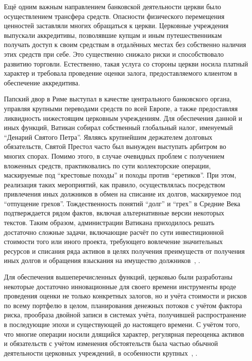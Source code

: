 \documentclass[12pt]{scrartcl}
\begin{document}
Ещё одним важным направлением банковской деятельности церкви было осуществлением трансфера средств. Опасности физического перемещения ценностей заставляли многих обращаться к церкви. Церковные учреждения выпускали аккредитивы, позволявшие купцам и иным путешественникам получать доступ к своим средствам в отдалённых местах без собственно наличия этих средств при себе. Это существенно снижало риски и способствовало развитию торговли. Естественно, такая услуга со стороны церкви носила платный характер и требовала проведение оценки залога, предоставляемого клиентом в обеспечение аккредитива.

Папский двор в Риме выступал в качестве центрального банковского органа, управляя крупными переводами средств по всей Европе, а также предоставляя ликвидность нижестоящим церковным учреждениям. Для обеспечения данной и иных функций, Ватикан собирал собственный глобальный налог, именуемый ``Денарий Святого Петра''. Являясь крупнейшим держателем долговых обязательств, Святой Престол часто был вынужден выступать арбитром во многих спорах. Помимо этого, в случае очевидных проблем с получением вложенных средств, практиковались по сути коллекторские операции, маскируемые под ``крестовые походы'' и походы против ``еретиков''. При этом, реализация таких мероприятий, как правило, осуществлялась посредством привлечения иных должников в обмен на списание их долгов, маскируемое под ``отпущение грехов''. Тождественность понятий ``долг'' и ``грех'' в Средние Века подтверждается рядом фактов, включая альтернативные версии некоторых текстов. Таким образом, администрации Ватикана приходилось решать достаточно сложные задачи, включающие расчёт по сути инвестиционной стоимости того или иного проекта, требующего вовлечение значительных ресурсов и списания ряда активов в целях получения преимуществ от получения иных долгов и обращения взыскания на имущество должников~\cite{Hollister2001}, \cite{Lynch2014}.

Для обеспечения вышеперечисленных функций, церковью были разработаны некоторые достаточно инновационные для своего времени инструменты вроде проведения оценки не только конкретных залогов, но и учёта стоимости и рисков по всему портфелю в целом, планирования денежных потоков с учётом фактора риска, прообраза двойной записи в системах учёта, получившей распространение в последующие эпохи и существующей до настоящего времени. С учётом того, что многие операции носили длящийся характер, регулярная переоценка активов и обязательств с учётом изменения обстоятельств была частью обычной деятельности церковных учреждений, в особенности крупных~\cite{Neal1999}, \cite{Postan1972}.
\end{document}
